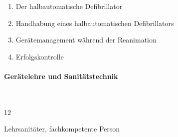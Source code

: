   \begin{enumerate}
    \item Der halbautomatische Defibrillator \dotfill {}
    \item Handhabung eines halbautomatischen Defibrillators \dotfill {}
    \item Gerätemanagement während der Reanimation \dotfill {}
    \item Erfolgskontrolle \dotfill {}
  \end{enumerate}

\paragraph{Gerätelehre und Sanitätstechnik }~
  
  \begin{inparadesc}
    \item[Stundenanzahl:]  12
    \item[Lehrkraft:]   Lehrsanitäter, fachkompetente Person
  \end{inparadesc}
  
